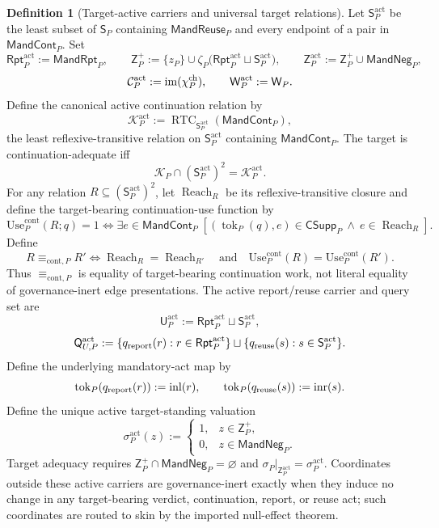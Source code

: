 \documentclass[11pt]{article}
\theoremstyle{definition}
\newtheorem{definition}[theorem]{Definition}
\newcommand{\Active}{\mathrm{act}}
\newcommand{\MandRpt}{\mathsf{MandRpt}}
\newcommand{\MandReuse}{\mathsf{MandReuse}}
\newcommand{\MandCont}{\mathsf{MandCont}}
\newcommand{\MandNeg}{\mathsf{MandNeg}}
\newcommand{\ContEq}{\equiv_{\mathrm{cont},P}}
\newcommand{\ContUse}{\mathrm{Use}^{\mathrm{cont}}_{P}}
\newcommand{\ContSupp}{\mathsf{CSupp}_{P}}
\begin{document}
\begin{definition}[Target-active carriers and universal target relations]\label{def:activecarriers}
Let $\mathsf S_P^{\Active}$ be the least subset of $\mathsf S_P$ containing $\MandReuse_P$ and every endpoint of a pair in $\MandCont_P$. Set
\[
\mathsf{Rpt}_P^{\Active}:=\MandRpt_P,
\qquad
\mathsf Z_P^{+}:=\{z_P\}\cup
\zeta_P\bigl(\mathsf{Rpt}_P^{\Active}\sqcup\mathsf S_P^{\Active}\bigr),
\qquad
\mathsf Z_P^{\Active}:=\mathsf Z_P^{+}\cup\MandNeg_P,
\]
\[
\mathcal C_P^{\Active}:=\operatorname{im}(\chi_P^{\rm ch}),
\qquad
\mathsf W_P^{\Active}:=\mathsf W_P.
\]
Define the canonical active continuation relation by
\[
\mathcal K_P^{\Active}:=\operatorname{RTC}_{\mathsf S_P^{\Active}}(\MandCont_P),
\]
the least reflexive-transitive relation on $\mathsf S_P^{\Active}$ containing $\MandCont_P$. The target is continuation-adequate iff
\[
\mathcal K_P\cap(\mathsf S_P^{\Active})^2=\mathcal K_P^{\Active}.
\]
For any relation $R\subseteq(\mathsf S_P^{\Active})^2$, let $\operatorname{Reach}_R$ be its reflexive-transitive closure and define the target-bearing continuation-use function by
\[
\ContUse(R;q)=1
\iff
\exists e\in\MandCont_P\;[(\operatorname{tok}_P(q),e)\in\ContSupp\ \wedge\ e\in\operatorname{Reach}_R].
\]
Define
\[
R\ContEq R'
\iff
\operatorname{Reach}_R=\operatorname{Reach}_{R'}
\quad\text{and}\quad
\ContUse(R)=\ContUse(R').
\]
Thus $\ContEq$ is equality of target-bearing continuation work, not literal equality of governance-inert edge presentations.
The active report/reuse carrier and query set are
\[
\mathsf U_P^{\Active}:=\mathsf{Rpt}_P^{\Active}\sqcup\mathsf S_P^{\Active},
\]
\[
\mathsf Q_{U,P}^{\Active}:=
\{q_{\rm report}(r):r\in\mathsf{Rpt}_P^{\Active}\}
\sqcup
\{q_{\rm reuse}(s):s\in\mathsf S_P^{\Active}\}.
\]
Define the underlying mandatory-act map by
\[
\operatorname{tok}_P(q_{\rm report}(r)):=\mathrm{inl}(r),
\qquad
\operatorname{tok}_P(q_{\rm reuse}(s)):=\mathrm{inr}(s).
\]
Define the unique active target-standing valuation
\[
\sigma_P^{\Active}(z):=
\begin{cases}
1,&z\in\mathsf Z_P^{+},\\
0,&z\in\MandNeg_P.
\end{cases}
\]
Target adequacy requires $\mathsf Z_P^{+}\cap\MandNeg_P=\varnothing$ and
$\sigma_P|_{\mathsf Z_P^{\Active}}=\sigma_P^{\Active}$.
Coordinates outside these active carriers are governance-inert exactly when they induce no change in any target-bearing verdict, continuation, report, or reuse act; such coordinates are routed to skin by the imported null-effect theorem.
\end{definition}
\end{document}
